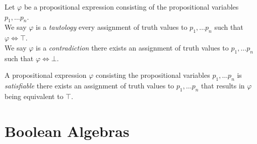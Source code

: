 \begin{definition}
    Let $\varphi$ be a propositional expression consisting of the propositional variables $p_1, \dots p_n$.\\
    We say $\varphi$ is a \emph{tautology}
    \iffbydefn every assignment of truth values to $p_1, \dots p_n$ such that $\varphi \iff \top$.\\
    We say $\varphi$ is a \emph{contradiction}
    \iffbydefn there exists an assignment of truth values to $p_1, \dots p_n$ such that $\varphi \iff \bot$.
\end{definition}
\begin{definition}[Satisfiability]
    A propositional expression $\varphi$ consisting the propositional variables $p_1, \dots p_n$ is \emph{satisfiable}
    \iffbydefn there exists an assignment of truth values to $p_1, \dots p_n$ that results in $\varphi$ being equivalent to $\top$.
\end{definition}

\section{Boolean Algebras}

